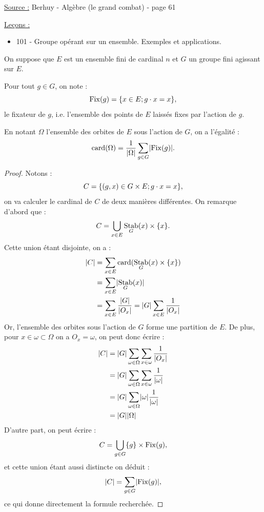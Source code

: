 

\DeclareMathOperator{\fix}{Fix}
\DeclareMathOperator{\stab}{Stab}

\pagestyle{fancy}

\fancyhead[C]{}
\fancyhead[R]{}



\underline{Source :} Berhuy - Algèbre (le grand combat) - page 61

\underline{Leçons :}
\begin{itemize}
\item 101 - Groupe opérant sur un ensemble. Exemples et applications.
\end{itemize}

On suppose que $E$ est un ensemble fini de cardinal $n$ et $G$ un groupe fini agissant sur $E$.

\begin{defn}[Fixateur]
Pour tout $g \in G$, on note :
\[ \fix(g) = \set{x \in E ; g \cdot x = x } , \]
le fixateur de $g$, i.e. l'ensemble des points de $E$ laissés fixes par l'action de $g$.
\end{defn}

\begin{thm}
En notant $\Omega$ l'ensemble des orbites de $E$ sous l'action de $G$, on a l'égalité :
\[ \card(\Omega) = \dfrac1{\abs{\Omega}} \sum_{g \in G} \abs{\fix(g)} . \]
\end{thm}

\begin{proof}
Notons :
\[ C = \{  (g,x) \in G \times E ; g \cdot x = x  \} , \]
on va calculer le cardinal de $C$ de deux manières différentes.
On remarque d'abord que :
\[ C = \bigcup_{x \in E} \stab_G(x) \times \set{x} . \]
Cette union étant disjointe, on a :
\begin{align*}
\abs{C} & = \sum_{x \in E} \card(\stab_G(x) \times \set{x}) \\
& = \sum_{x \in E} \abs{ \stab_G(x) } \\
& = \sum_{x \in E} \dfrac{\abs{G}}{\abs{O_x}} 
 = \abs{G} \sum_{x \in E} \dfrac1{\abs{O_x}} \\
\end{align*}
Or, l'ensemble des orbites sous l'action de $G$ forme une partition de $E$. 
De plus, pour $x \in \omega \subset \Omega$ on a $O_x = \omega$, on peut donc écrire :
\begin{align*}
\lvert C\rvert & = \lvert G\rvert \sum_{\omega \in \Omega} \sum_{x \in \omega} \dfrac1{\lvert O_x\rvert} \\
& = \lvert G\rvert \sum_{\omega \in \Omega} \sum_{x \in \omega} \dfrac1{\lvert\omega\rvert} \\
& = \lvert G\rvert \sum_{\omega \in \Omega} \lvert\omega\rvert \dfrac1{\lvert\omega\rvert} \\
& = \lvert G\rvert \lvert\Omega\rvert
\end{align*}
D'autre part, on peut écrire :
\[ C = \bigcup_{g \in G} \set{g} \times \fix(g) , \]
et cette union étant aussi distincte on déduit :
\[ \abs{C} = \sum_{g \in G}  \abs{\fix(g)} , \]
ce qui donne directement la formule recherchée.
\end{proof}

